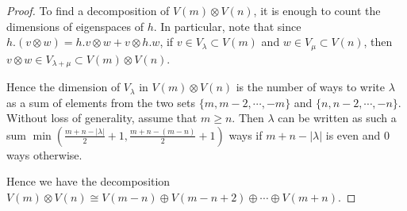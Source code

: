 \begin{proof}
  To find a decomposition of $V(m)\otimes V(n)$, it is enough to count the dimensions of eigenspaces of $h$. In particular, note that since $h.(v\otimes w) = h.v\otimes w+v\otimes h.w$, if $v \in V_{\lambda} \subset V(m)$ and $w \in V_{\mu} \subset V(n)$, then $v\otimes w \in V_{\lambda+\mu} \subset V(m)\otimes V(n)$.

  Hence the dimension of $V_{\lambda}$ in $V(m)\otimes V(n)$ is the number of ways to write $\lambda$ as a sum of elements from the two sets $\{m,m-2,\cdots,-m\}$ and $\{n, n-2,\cdots,-n\}$. Without loss of generality, assume that $m \geqslant n$. Then $\lambda$ can be written as such a sum $\min(\frac{m+n-|\lambda|}{2} + 1, \frac{m+n-(m-n)}{2} + 1)$ ways if $m+ n - |\lambda|$ is even and $0$ ways otherwise.

  Hence we have the decomposition $V(m)\otimes V(n) \cong V(m-n)\oplus V(m-n+2)\oplus\cdots\oplus V(m+n)$.
\end{proof}

